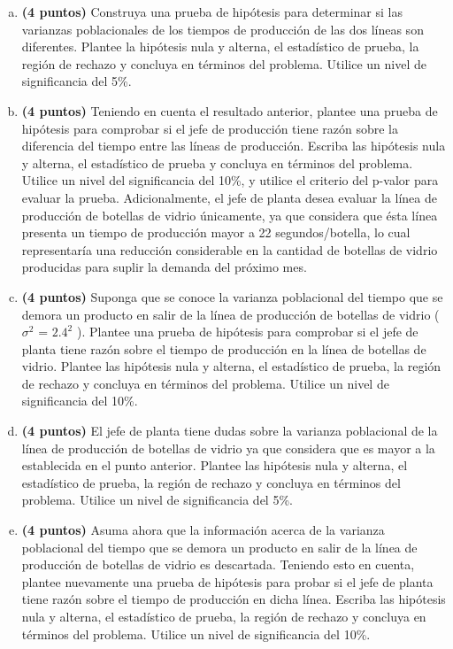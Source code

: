 \documentclass[../main.tex]{subfiles}
\begin{document}
\begin{enumerate}[(a)]

\item \textbf{(4 puntos)} Construya una prueba de hipótesis para determinar si las varianzas
poblacionales de los tiempos de producción de las dos líneas son diferentes. Plantee la
hipótesis nula y alterna, el estadístico de prueba, la región de rechazo y concluya en términos
del problema. Utilice un nivel de significancia del 5\%.

\item \textbf{(4 puntos)} Teniendo en cuenta el resultado anterior, plantee una prueba de hipótesis para comprobar si el jefe de producción tiene razón sobre la diferencia del tiempo entre las líneas de producción. Escriba las hipótesis nula y alterna, el estadístico de prueba y concluya en términos del problema. Utilice un nivel del significancia del 10\%, y utilice el criterio del p-valor para evaluar la prueba. Adicionalmente, el jefe de planta desea evaluar la línea de producción de botellas de vidrio únicamente, ya que considera que ésta línea presenta un tiempo de producción mayor a 22 segundos/botella, lo cual representaría una reducción considerable en la cantidad de botellas de vidrio producidas para suplir la demanda del próximo mes.

\item \textbf{(4 puntos)} Suponga que se conoce la varianza poblacional del tiempo que se demora un producto en salir de la línea de producción de botellas de vidrio ($\sigma ^2$ = $2.4^2$ ). Plantee una prueba de hipótesis para comprobar si el jefe de planta tiene razón sobre el tiempo de producción en la línea de botellas de vidrio. Plantee las hipótesis nula y alterna, el estadístico de prueba, la región de rechazo y concluya en términos del problema. Utilice un nivel de significancia del 10\%.

\item \textbf{(4 puntos)}  El jefe de planta tiene dudas sobre la varianza poblacional de la línea de producción de botellas de vidrio ya que considera que es mayor a la establecida en el punto
anterior. Plantee las hipótesis nula y alterna, el estadístico de prueba, la región de rechazo
y concluya en términos del problema. Utilice un nivel de significancia del 5\%.

\item \textbf{(4 puntos)} Asuma ahora que la información acerca de la varianza poblacional del tiempo que se demora un producto en salir de la línea de producción de botellas de vidrio es
descartada. Teniendo esto en cuenta, plantee nuevamente una prueba de hipótesis para
probar si el jefe de planta tiene razón sobre el tiempo de producción en dicha línea. Escriba
las hipótesis nula y alterna, el estadístico de prueba, la región de rechazo y concluya en
términos del problema. Utilice un nivel de significancia del 10\%.

\end{enumerate}
\end{document}
